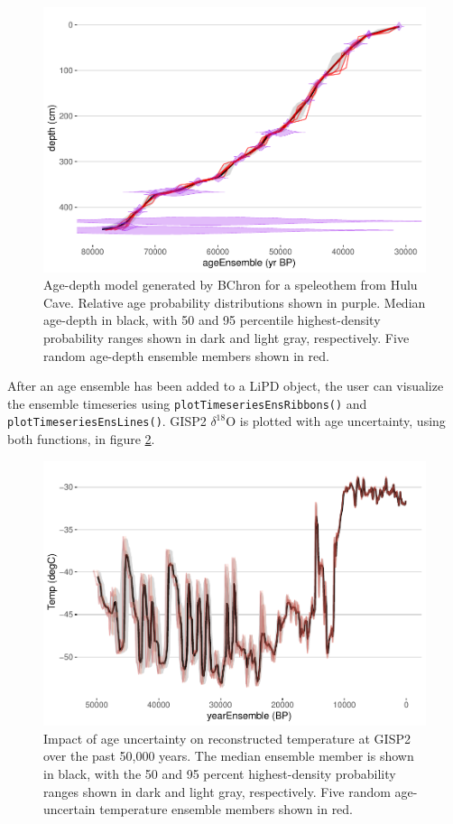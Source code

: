 \documentclass[gchron, manuscript]{copernicus}
\begin{document}
\begin{figure}
\includegraphics[width=12cm]{geoChronR-paper_files/figure-latex/age-model-1} \caption{Age-depth model generated by BChron for a speleothem from Hulu Cave. Relative age probability distributions shown in purple. Median age-depth in black, with 50 and 95 percentile highest-density probability ranges shown in dark and light gray, respectively. Five random age-depth ensemble members shown in red.}\label{fig:age-model}
\end{figure}

After an age ensemble has been added to a LiPD object, the user can visualize the ensemble timeseries using \texttt{plotTimeseriesEnsRibbons()} and \texttt{plotTimeseriesEnsLines()}.
GISP2 \(\delta^{18}\)O is plotted with age uncertainty, using both functions, in figure \ref{fig:timeseries}.

\begin{figure}
\includegraphics[width=12cm]{geoChronR-paper_files/figure-latex/timeseries-1} \caption{Impact of age uncertainty on reconstructed temperature at GISP2 over the past 50,000 years. The median ensemble member is shown in black, with the 50 and 95 percent highest-density probability ranges shown in dark and light gray, respectively. Five random age-uncertain temperature ensemble members shown in red.}\label{fig:timeseries}
\end{figure}
\end{document}
